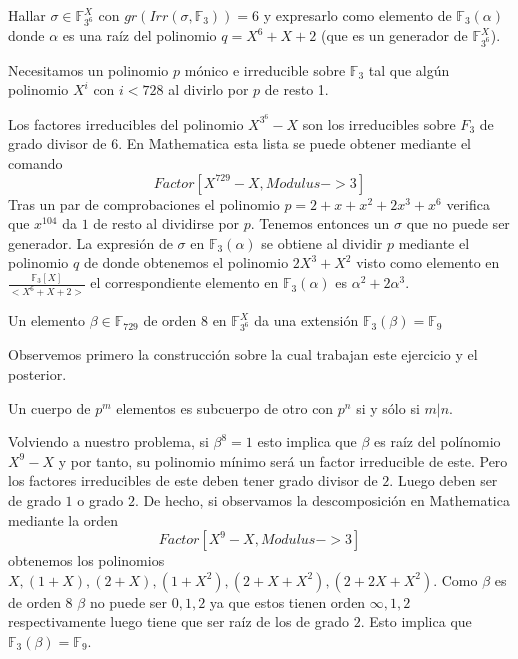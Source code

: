 \begin{exercise}
	Hallar $\sigma \in \mathbb{F}_{3^6}^X$ con $gr(Irr(\sigma,\mathbb{F}_3)) = 6$ y expresarlo como elemento de $\mathbb{F}_3(\alpha)$ donde $\alpha$ es una raíz del polinomio $q = X^6 + X + 2$ (que es un generador de $\mathbb{F}_{3^6}^X$).
\end{exercise}

Necesitamos un polinomio $p$ mónico e irreducible sobre $\mathbb{F}_3$ tal que algún polinomio $X^{i}$ con $i < 728$ al divirlo por $p$ de resto 1. 

Los factores irreducibles del polinomio $X^{3^6} - X$ son los irreducibles sobre $F_3$ de grado divisor de $6$. En Mathematica esta lista se puede obtener mediante el comando $$Factor[X^{729} - X, Modulus -> 3]$$ Tras un par de comprobaciones el polinomio $p = 2+x+x^2+2x^3+x^6$ verifica que $x^{104}$  da $1$ de resto al dividirse por $p$. Tenemos entonces un $\sigma$ que no puede ser generador. La expresión de $\sigma$ en $\mathbb{F}_3(\alpha)$ se obtiene al dividir $p$ mediante el polinomio $q$ de donde obtenemos el polinomio $2X^3+X^2$ visto como elemento en $\frac{\mathbb{F}_3[X]}{<X^6+X+2>}$ el correspondiente elemento en $\mathbb{F}_3(\alpha)$ es $\alpha^2+2 \alpha^3$. 

\begin{exercise}
	Un elemento $\beta \in \mathbb{F}_{729}$ de orden 8 en $\mathbb{F}_{3^6}^X$ da una extensión $\mathbb{F}_3(\beta) = \mathbb{F}_9$
\end{exercise}

Observemos primero la construcción sobre la cual trabajan este ejercicio y el posterior. 


Un cuerpo de $p^m$ elementos es subcuerpo de otro con $p^n$ si y sólo si $m|n$. 

Volviendo a nuestro problema, si $\beta^8 = 1$ esto implica que $\beta$ es raíz del polínomio $X^9 - X$ y por tanto, su polinomio mínimo será un factor irreducible de este. Pero los factores irreducibles de este deben tener grado divisor de $2$. Luego deben ser de grado $1$ o grado $2$. De hecho, si observamos la descomposición en Mathematica mediante la orden $$Factor[X^9-X,Modulus->3]$$ obtenemos los polinomios $X,(1 + X),(2 + X),(1 + X^2),(2 + X + X^2),(2 + 2 X + X^2)$. Como $\beta$ es de orden $8$ $\beta$ no puede ser $0,1,2$ ya que estos tienen orden $\infty,1,2$ respectivamente luego tiene que ser raíz de los de grado $2$. Esto implica que $\mathbb{F}_3(\beta) = \mathbb{F}_9$. 

